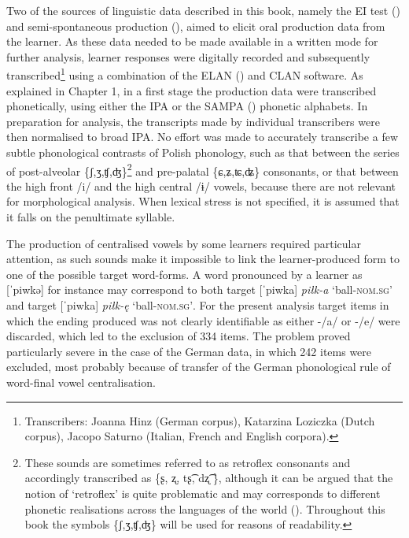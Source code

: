 Two of the sources of linguistic data described in this book, namely the EI test () and semi-spontaneous production (), aimed to elicit oral production data from the learner. As these data needed to be made available in a written mode for further analysis, learner responses were digitally recorded and subsequently transcribed\footnote{Transcribers: Joanna Hinz (German corpus), Katarzina Loziczka (Dutch corpus), Jacopo Saturno (Italian, French and English corpora).} using a combination of the ELAN (\citealt{BrugmanRussell2004}) and CLAN \citep{MacWhinney2000} software. As explained in Chapter 1, in a first stage the production data were transcribed phonetically, using either the IPA \citep{LandauEtAl1999} or the SAMPA (\citealt{Wells1997, Wells1995}) phonetic alphabets. In preparation for analysis, the transcripts made by individual transcribers were then normalised to broad IPA. No effort was made to accurately transcribe a few subtle phonological contrasts of Polish phonology, such as that between the series of post-alveolar \{ʃ,ʒ,ʧ,ʤ\}\footnote{These sounds are sometimes referred to as retroflex consonants and accordingly transcribed as \{ʂ, ʐ, tʂ͡, dʐ͡ \}, although it can be argued that the notion of ‘retroflex’ is quite problematic and may corresponds to different phonetic realisations across the languages of the world (\citealt{Hamann2002, Hamann2003, Hamann2004, Żygis2003, ŻygisHamann2003, PadgettŻygis2007, ŻygisPadgett2010}). Throughout this book the symbols \{ʃ,ʒ,ʧ,ʤ\} will be used for reasons of readability.} and pre-palatal \{ɕ,ʑ,ʨ,ʥ\} consonants, or that between the high front /i/ and the high central /ɨ/ vowels, because there are not relevant for morphological analysis. When lexical stress is not specified, it is assumed that it falls on the penultimate syllable.

The production of centralised vowels by some learners required particular attention, as such sounds make it impossible to link the learner-produced form to one of the possible target word-forms. A word pronounced by a learner as [ˈpiwkə] for instance may correspond to both target [ˈpiwka] \textit{piłk-a} ‘ball-\textsc{nom.sg}’ and target [ˈpiwka] \textit{piłk-ę} ‘ball-\textsc{nom.sg’}. For the present analysis target items in which the ending produced was not clearly identifiable as either -/a/ or -/e/ were discarded, which led to the exclusion of 334 items. The problem proved particularly severe in the case of the German data, in which 242 items were excluded, most probably because of transfer of the German phonological rule of word-final vowel centralisation. 

